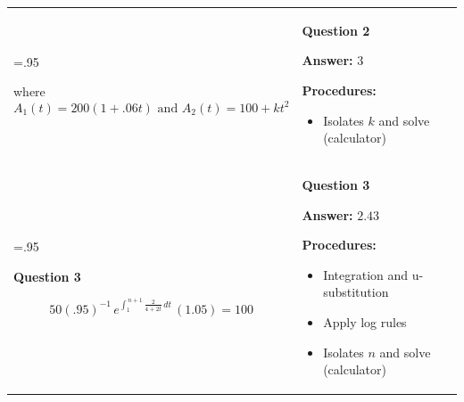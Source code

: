 \documentclass[11pt]{article}
\begin{document}
\begin{tabularx}{\linewidth}{>{\hsize=.95\hsize}X >{\hsize=1.05\hsize}X}
\begin{tcolorbox}[height=5cm,valign=top]
where \[A_1(t) = 200(1+.06t) \text{ and } A_2(t) =100+kt^2\]
\end{tcolorbox}
&
\begin{tcolorbox}[height=5cm,valign=top]
\textbf{Question 2}

\begin{center}
\textbf{Answer:} $3$
\end{center}

\textbf{Procedures:}
\begin{itemize} 
    \item Isolates $k$ and solve (calculator)
\end{itemize}
\end{tcolorbox}
\\[6pt]


\begin{tcolorbox}[height=5cm,valign=top]
\textbf{Question 3}

\vspace{.5cm}

\[
50
\left(.95\right)^{-1}
\, e^{\displaystyle \int_{1}^{\,n+1} \frac{2}{4+2t} \, dt}
\, \left(1.05\right)
=
100
\]



\end{tcolorbox}
&
\begin{tcolorbox}[height=5cm,valign=top]
\textbf{Question 3}

\begin{center}
\textbf{Answer:} $2.43$
\end{center}

\textbf{Procedures:}
\begin{itemize} 
    \item Integration and u-substitution
    \item Apply log rules
    \item Isolates $n$ and solve (calculator)
\end{itemize}
\end{tcolorbox}
\\[6pt]




\end{tabularx}
\end{document}
